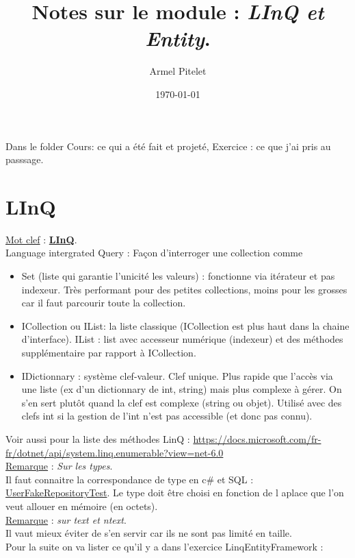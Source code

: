 \documentclass[a4paper,12pt,twoside]{article}
\title{Notes sur le module : \textit{LInQ et Entity}.}
\author{Armel Pitelet}
\date{\today}
\newcommand{\urlcolor}{magenta}  %
\newcommand{\keycolor}{purple} %
\newcommand{\rem}[2]{\noindent\underline{Remarque} : \textit{#1}.\\ \indent #2}
\newcommand{\keyref}[2]{\hypersetup{urlcolor=\keycolor} \href{#1}{\textbf{#2}}\hypersetup{urlcolor=\urlcolor}}
\newcommand{\keyword}[3]{\noindent\underline{Mot clef} : \keyref{#1}{#2}. \\ \indent #3}
\begin{document}
\maketitle
\tableofcontents

Dans le folder Cours: ce qui a été fait et projeté, Exercice : ce que j'ai pris au passsage.

\section{LInQ}

\keyword{https://docs.microsoft.com/fr-fr/dotnet/csharp/programming-guide/concepts/linq/}{LInQ}{Language intergrated Query : Façon d'interroger une collection comme 
\begin{itemize}
 \item Set (liste qui garantie l'unicité les valeurs) : fonctionne via itérateur et pas indexeur. Très performant pour des petites collections, moins pour les grosses car il faut parcourir toute la collection.
 \item ICollection ou IList: la liste classique (ICollection est plus haut dans la chaine d'interface). IList : list avec accesseur numérique (indexeur) et des méthodes supplémentaire par rapport à ICollection.
 \item IDictionnary : système clef-valeur. Clef unique. Plus rapide que l'accès via une liste (ex d'un dictionnary de int, string) mais plus complexe à gérer. On s'en sert plutôt quand la clef est complexe (string ou objet). Utilisé avec des clefs int si la gestion de l'int n'est pas accessible (et donc pas connu). 
 \end{itemize}
 Voir aussi pour la liste des méthodes LinQ : \url{https://docs.microsoft.com/fr-fr/dotnet/api/system.linq.enumerable?view=net-6.0}\\
 }

\rem{Sur les types}{Il faut connaitre la correspondance de type en c\# et SQL : \url{UserFakeRepositoryTest}. Le type doit être choisi en fonction de l aplace que l'on veut allouer en mémoire (en octets).}\\

\rem{sur text et ntext}{Il vaut mieux éviter de s'en servir car ils ne sont pas limité en taille.}\\

Pour la suite on va lister ce qu'il y a dans l'exercice LinqEntityFramework : \\
\end{document}
